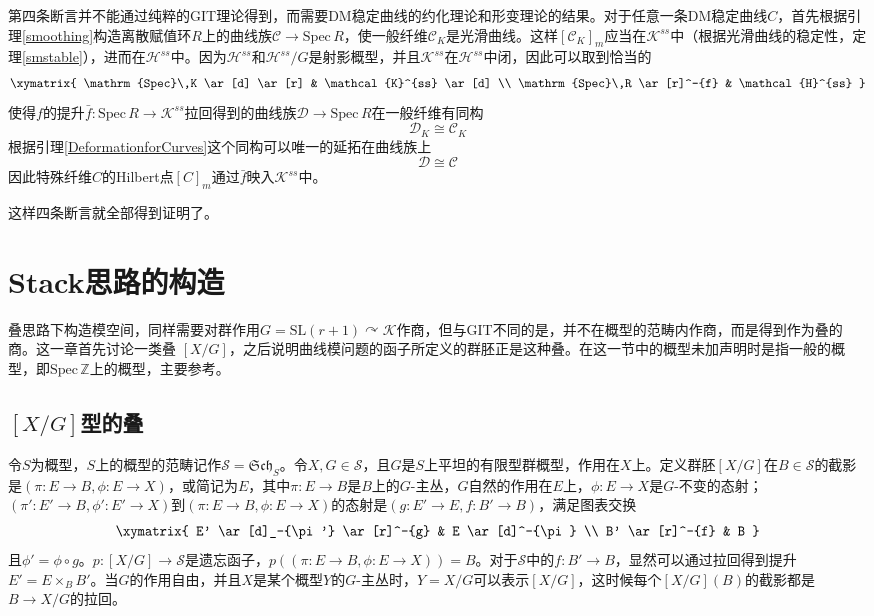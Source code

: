 第四条断言并不能通过纯粹的GIT理论得到，而需要DM稳定曲线的约化理论和形变理论的结果。对于任意一条DM稳定曲线$ C $，首先根据引理\ref{smoothing}构造离散赋值环$ R $上的曲线族$ \mathcal{C}\to \mathrm{Spec}\,R $，使一般纤维$ \mathcal{C}_K $是光滑曲线。这样$ [\mathcal{C}_K]_m $应当在$ \mathcal{K}^{ss} $中（根据光滑曲线的稳定性，定理\ref{smstable}），进而在$ \mathcal{H}^{ss} $中。因为$ \mathcal{H}^{ss} $和$ \mathcal{H}^{ss}/G $是射影概型，并且$ \mathcal{K}^{ss} $在$ \mathcal{H}^{ss} $中闭，因此可以取到恰当的
$$ \xymatrix{
	\mathrm{Spec}\,K \ar[d] \ar[r] & \mathcal{K}^{ss} \ar[d] \\
	\mathrm{Spec}\,R \ar[r]^-{f} & \mathcal{H}^{ss}
} $$
使得$ f $的提升$ \bar{f}:\mathrm{Spec}\,R\to \mathcal{K}^{ss} $拉回得到的曲线族$ \mathcal{D}\to \mathrm{Spec}\,R $在一般纤维有同构
$$ \mathcal{D}_K\cong \mathcal{C}_K $$
根据引理\ref{DeformationforCurves}这个同构可以唯一的延拓在曲线族上
$$ \mathcal{D}\cong \mathcal{C} $$
因此特殊纤维$ C $的Hilbert点$ [C]_m $通过$ \bar{f} $映入$ \mathcal{K}^{ss} $中。

这样四条断言就全部得到证明了。

\section{Stack思路的构造}
叠思路下构造模空间，同样需要对群作用$G=\mathrm{SL}(r+1)\curvearrowright \mathcal{K} $作商，但与GIT不同的是，并不在概型的范畴内作商，而是得到作为叠的商。这一章首先讨论一类叠 $ [X/G] $，之后说明曲线模问题的函子所定义的群胚正是这种叠。在这一节中的概型未加声明时是指一般的概型，即$ \mathrm{Spec}\,\mathbb{Z} $上的概型，主要参考\cite{DM69,GeometryAlgCurvesII,NotesModuliSpaceofCurves}。
\subsection{$ [X/G] $型的叠}\label{X/G}
令$ S $为概型，$ S $上的概型的范畴记作$ \mathscr{S}=\mathfrak{Sch}_S $。令$ X,G\in \mathscr{S} $，且$ G $是$ S $上平坦的有限型群概型，作用在$ X $上。定义群胚$ [X/G] $在$ B\in \mathscr{S} $的截影是$ (\pi:E\to B,\phi:E\to X) $，或简记为$ E $，其中$ \pi:E\to B $是$ B $上的$ G $-主丛，$ G $自然的作用在$ E $上，$ \phi:E\to X $是$ G $-不变的态射；$ (\pi':E'\to B,\phi':E'\to X) $到$ (\pi:E\to B,\phi:E\to X) $的态射是$ (g:E'\to E,f:B'\to B) $，满足图表交换 
$$ \xymatrix{
	E' \ar[d]_-{\pi'} \ar[r]^-{g} & E \ar[d]^-{\pi} \\
	B' \ar[r]^-{f} & B
} $$
且$ \phi'=\phi\circ g $。$ p:[X/G]\to \mathscr{S} $是遗忘函子，$ p((\pi:E\to B,\phi:E\to X) ) =B$。对于$ \mathscr{S} $中的$ f:B'\to B $，显然可以通过拉回得到提升$ E'=E\times_B B' $。当$ G $的作用自由，并且$ X $是某个概型$ Y $的$ G $-主丛时，$ Y=X/G $可以表示$ [X/G] $，这时候每个$ [X/G](B) $的截影都是$ B\to X/G $的拉回。

